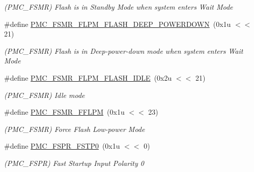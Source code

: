 \begin{DoxyCompactItemize}
\begin{DoxyCompactList}\small\item\em (P\+M\+C\+\_\+\+F\+S\+MR) Flash is in Standby Mode when system enters Wait Mode \end{DoxyCompactList}\item 
\mbox{\label{group__SAMV71__PMC_gac9ac32beca66e3facdd728f767c05947}} 
\#define \mbox{\hyperlink{group__SAMV71__PMC_gac9ac32beca66e3facdd728f767c05947}{P\+M\+C\+\_\+\+F\+S\+M\+R\+\_\+\+F\+L\+P\+M\+\_\+\+F\+L\+A\+S\+H\+\_\+\+D\+E\+E\+P\+\_\+\+P\+O\+W\+E\+R\+D\+O\+WN}}~(0x1u $<$$<$ 21)
\begin{DoxyCompactList}\small\item\em (P\+M\+C\+\_\+\+F\+S\+MR) Flash is in Deep-\/power-\/down mode when system enters Wait Mode \end{DoxyCompactList}\item 
\mbox{\label{group__SAMV71__PMC_gae770c6c0b02343c3c8f0f3adb16ef28f}} 
\#define \mbox{\hyperlink{group__SAMV71__PMC_gae770c6c0b02343c3c8f0f3adb16ef28f}{P\+M\+C\+\_\+\+F\+S\+M\+R\+\_\+\+F\+L\+P\+M\+\_\+\+F\+L\+A\+S\+H\+\_\+\+I\+D\+LE}}~(0x2u $<$$<$ 21)
\begin{DoxyCompactList}\small\item\em (P\+M\+C\+\_\+\+F\+S\+MR) Idle mode \end{DoxyCompactList}\item 
\mbox{\label{group__SAMV71__PMC_gaecef669ce38e5456c894881c59b6e904}} 
\#define \mbox{\hyperlink{group__SAMV71__PMC_gaecef669ce38e5456c894881c59b6e904}{P\+M\+C\+\_\+\+F\+S\+M\+R\+\_\+\+F\+F\+L\+PM}}~(0x1u $<$$<$ 23)
\begin{DoxyCompactList}\small\item\em (P\+M\+C\+\_\+\+F\+S\+MR) Force Flash Low-\/power Mode \end{DoxyCompactList}\item 
\mbox{\label{group__SAMV71__PMC_ga813b8b86e05864b604df5c1285ba13da}} 
\#define \mbox{\hyperlink{group__SAMV71__PMC_ga813b8b86e05864b604df5c1285ba13da}{P\+M\+C\+\_\+\+F\+S\+P\+R\+\_\+\+F\+S\+T\+P0}}~(0x1u $<$$<$ 0)
\begin{DoxyCompactList}\small\item\em (P\+M\+C\+\_\+\+F\+S\+PR) Fast Startup Input Polarity 0 \end{DoxyCompactList}\item 

\end{DoxyCompactItemize}
